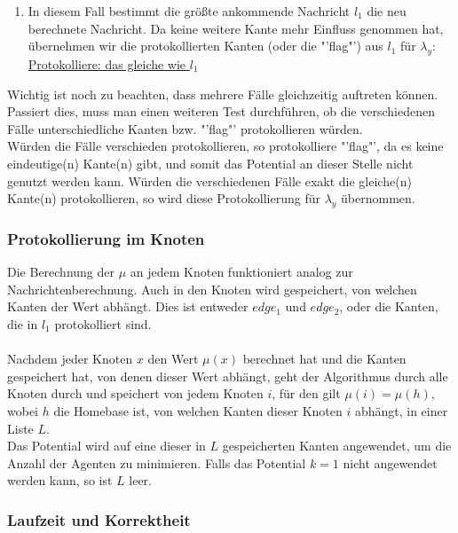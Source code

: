 \begin{enumerate}[label=\alph*)]
	\item In diesem Fall bestimmt die größte ankommende Nachricht $l_{1}$ die neu berechnete Nachricht. Da keine weitere Kante mehr Einfluss genommen hat, übernehmen wir die protokollierten Kanten (oder die "'flag"') aus $l_{1}$ für $\lambda_{y}$: \uline{Protokolliere: das gleiche wie $l_{1}$}
	
\end{enumerate}
Wichtig ist noch zu beachten, dass mehrere Fälle gleichzeitig auftreten können. Passiert dies, muss man einen weiteren Test durchführen, ob die verschiedenen Fälle unterschiedliche Kanten bzw. "'flag"' protokollieren würden.
\\
Würden die Fälle verschieden protokollieren, so protokolliere "'flag"', da es keine eindeutige(n) Kante(n) gibt, und somit das Potential an dieser Stelle nicht genutzt werden kann. Würden die verschiedenen Fälle exakt die gleiche(n) Kante(n) protokollieren, so wird diese Protokollierung für $\lambda_{y}$ übernommen.

\subsubsection{Protokollierung im Knoten}

Die Berechnung der $\mu$ an jedem Knoten funktioniert analog zur Nachrichtenberechnung. Auch in den Knoten wird gespeichert, von welchen Kanten der Wert abhängt. Dies ist entweder $edge_{1}$ und $edge_{2}$, oder die Kanten, die in $l_{1}$ protokolliert sind.
\\
\\
Nachdem jeder Knoten $x$ den Wert $\mu(x)$ berechnet hat und die Kanten gespeichert hat, von denen dieser Wert abhängt, geht der Algorithmus durch alle Knoten durch und speichert von jedem Knoten $i$, für den gilt $\mu(i) = \mu(h)$, wobei $h$ die Homebase ist, von welchen Kanten dieser Knoten $i$ abhängt, in einer Liste $L$. \\
Das Potential wird auf eine dieser in $L$ gespeicherten Kanten angewendet, um die Anzahl der Agenten zu minimieren. Falls das Potential $k = 1$ nicht angewendet werden kann, so ist $L$ leer.

\subsubsection{Laufzeit und Korrektheit}


